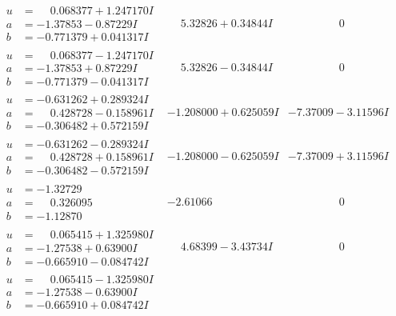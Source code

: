 \documentclass[1p]{elsarticle_modified}
\theoremstyle{definition}
\begin{document}
$$\begin{array}{c|c|c}
\begin{aligned}
u &= \phantom{-}0.068377 + 1.247170 I \\
a &= -1.37853 - 0.87229 I \\
b &= -0.771379 + 0.041317 I\end{aligned}
 & \phantom{-}5.32826 + 0.34844 I & \phantom{-0.000000 } 0 \\ \hline\begin{aligned}
u &= \phantom{-}0.068377 - 1.247170 I \\
a &= -1.37853 + 0.87229 I \\
b &= -0.771379 - 0.041317 I\end{aligned}
 & \phantom{-}5.32826 - 0.34844 I & \phantom{-0.000000 } 0 \\ \hline\begin{aligned}
u &= -0.631262 + 0.289324 I \\
a &= \phantom{-}0.428728 - 0.158961 I \\
b &= -0.306482 + 0.572159 I\end{aligned}
 & -1.208000 + 0.625059 I & -7.37009 - 3.11596 I \\ \hline\begin{aligned}
u &= -0.631262 - 0.289324 I \\
a &= \phantom{-}0.428728 + 0.158961 I \\
b &= -0.306482 - 0.572159 I\end{aligned}
 & -1.208000 - 0.625059 I & -7.37009 + 3.11596 I \\ \hline\begin{aligned}
u &= -1.32729\phantom{ +0.000000I} \\
a &= \phantom{-}0.326095\phantom{ +0.000000I} \\
b &= -1.12870\phantom{ +0.000000I}\end{aligned}
 & -2.61066\phantom{ +0.000000I} & \phantom{-0.000000 } 0 \\ \hline\begin{aligned}
u &= \phantom{-}0.065415 + 1.325980 I \\
a &= -1.27538 + 0.63900 I \\
b &= -0.665910 - 0.084742 I\end{aligned}
 & \phantom{-}4.68399 - 3.43734 I & \phantom{-0.000000 } 0 \\ \hline\begin{aligned}
u &= \phantom{-}0.065415 - 1.325980 I \\
a &= -1.27538 - 0.63900 I \\
b &= -0.665910 + 0.084742 I\end{aligned}

\end{array}$$
\end{document}
